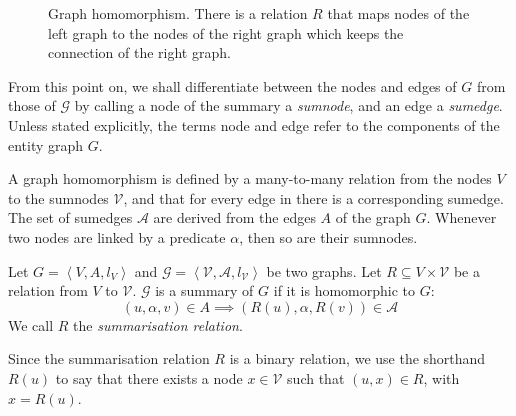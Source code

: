 \begin{figure}
	\centering
	
	\caption{Graph homomorphism. There is a relation $R$ that maps nodes of the left graph to the nodes of the right graph which keeps the connection of the right graph.}
	\label{fig:homomorphism}
\end{figure}

\begin{remark}
From this point on, we shall differentiate between the nodes and edges of $G$ from those of $\mathcal{G}$ by calling a node of the summary a \emph{sumnode}, and an edge a \emph{sumedge}. Unless stated explicitly, the terms node and edge refer to the components of the entity graph $G$.
\end{remark}

A graph homomorphism is defined by a many-to-many relation from the nodes $V$ to the sumnodes $\mathcal{V}$, and that for every edge in there is a corresponding sumedge. The set of sumedges $\mathcal{A}$ are derived from the edges $A$ of the graph $G$. Whenever two nodes are linked by a predicate $\alpha$, then so are their sumnodes.

\begin{definition}
Let $G=\left\langle V, A, l_V \right\rangle$ and $\mathcal{G}=\left\langle \mathcal{V}, \mathcal{A}, l_\mathcal{V} \right\rangle$ be two graphs. Let $R \subseteq V \times \mathcal{V}$ be a relation from $V$ to $\mathcal{V}$.
$\mathcal{G}$ is a summary of $G$ if it is homomorphic to $G$:
$$
(u, \alpha, v) \in A \implies \left(R(u), \alpha, R(v)\right) \in \mathcal{A}
$$
We call $R$ the \emph{summarisation relation}.
\end{definition}

\begin{remark}
Since the summarisation relation $R$ is a binary relation, we use the shorthand $R(u)$ to say that there exists a node $x \in \mathcal{V}$ such that $(u, x) \in R$, with $x = R(u)$.
\end{remark}


